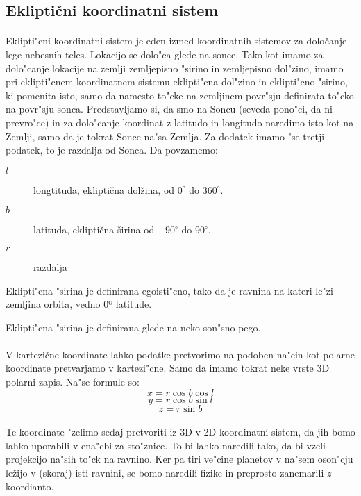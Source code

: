 \subsection*{Ekliptični koordinatni sistem}
\label{eklipticni_sistem}
	
\paragraph{}
Eklipti"cni koordinatni sistem je eden izmed koordinatnih sistemov za določanje lege nebesnih teles. Lokacijo se dolo"ca glede na sonce. Tako kot imamo za dolo"canje lokacije na zemlji zemljepisno "sirino in zemljepisno dol"zino, imamo pri eklipti"cnem koordinatnem sistemu eklipti"cna dol"zino in eklipti"cno "sirino, ki pomenita isto, samo da namesto to"cke na zemljinem povr"sju definirata to"cko na povr"sju sonca. Predstavljamo si, da smo na Soncu (seveda pono"ci, da ni prevro"ce) in za dolo"canje koordinat z latitudo in longitudo naredimo isto kot na Zemlji, samo da je tokrat Sonce na"sa Zemlja. Za dodatek imamo "se tretji podatek, to je razdalja od Sonca. Da povzamemo:
\begin{description}
	\item[$l$] longtituda, ekliptična dolžina, od $0^\circ$ do $360^\circ$.
	\item[$b$] latituda, ekliptična širina od $-90^\circ$ do $90^\circ$.
	\item[$r$] razdalja
\end{description}

Eklipti"cna "sirina je definirana egoisti"cno, tako da je ravnina na kateri le"zi zemljina orbita, vedno 0º latitude.

Eklipti"cna "sirina je definirana glede na neko son"sno pego.

\paragraph{}
V kartezične koordinate lahko podatke pretvorimo na podoben na"cin kot polarne koordinate pretvarjamo v kartezi"cne. Samo da imamo tokrat neke vrste 3D polarni zapis. Na"se formule so:\newpage
$$x = r \cos b \cos l$$
$$y = r \cos b \sin l$$
$$z = r \sin b$$

\paragraph{}
Te koordinate "zelimo sedaj pretvoriti iz 3D v 2D koordinatni sistem, da jih bomo lahko uporabili v ena"cbi za sto"znice. To bi lahko naredili tako, da bi vzeli projekcijo na"sih to"ck na ravnino. Ker pa tiri ve"cine planetov v na"sem oson"cju ležijo v (skoraj) isti ravnini, se bomo naredili fizike in preprosto zanemarili $z$ koordianto.